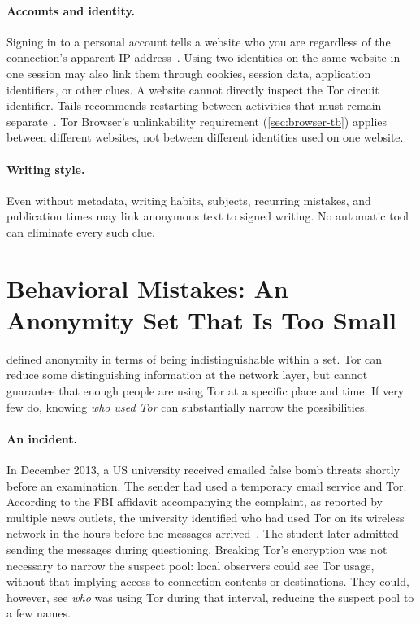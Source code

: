 \paragraph{Accounts and identity.} Signing in to a personal account tells a website who you are regardless of the connection's apparent IP address~\cite{torsafety}. Using two identities on the same website in one session may also link them through cookies, session data, application identifiers, or other clues. A website cannot directly inspect the Tor circuit identifier. Tails recommends restarting between activities that must remain separate~\cite{tailswarnings}. Tor Browser's unlinkability requirement (\cref{sec:browser-tb}) applies between different websites, not between different identities used on one website.

\paragraph{Writing style.} Even without metadata, writing habits, subjects, recurring mistakes, and publication times may link anonymous text to signed writing. No automatic tool can eliminate every such clue.

\section{Behavioral Mistakes: An Anonymity Set That Is Too Small}\label{sec:opsec-insieme}

 defined anonymity in terms of being indistinguishable within a set. Tor can reduce some distinguishing information at the network layer, but cannot guarantee that enough people are using Tor at a specific place and time. If very few do, knowing \emph{who used Tor} can substantially narrow the possibilities.

\paragraph{An incident.} In December 2013, a US university received emailed false bomb threats shortly before an examination. The sender had used a temporary email service and Tor. According to the FBI affidavit accompanying the complaint, as reported by multiple news outlets, the university identified who had used Tor on its wireless network in the hours before the messages arrived~\cite{wbur2013harvard,sandvik2013harvard}. The student later admitted sending the messages during questioning. Breaking Tor's encryption was not necessary to narrow the suspect pool: local observers could see Tor usage, without that implying access to connection contents or destinations. They could, however, see \emph{who} was using Tor during that interval, reducing the suspect pool to a few names.

